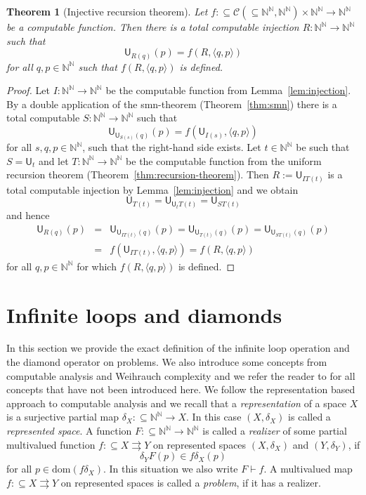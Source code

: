 \documentclass[11pt,a4paper]{amsart}
\theoremstyle{plain}
\newtheorem{thm}{Theorem}[section]
\theoremstyle{definition}
\theoremstyle{defC}
\theoremstyle{thmC}
\theoremstyle{plain}
\numberwithin{equation}{section}
\def\CC{{\mathcal C}}
\def\IN{{\mathbb{N}}}
\def\In{\subseteq}
\def\mto{\rightrightarrows}
\def\U{{\mathsf{{U}}}}
\def\dom{{\mathrm{dom}}}
\begin{document}
\begin{thm}[Injective recursion theorem]
\label{thm:injective-recursion}
Let $f:\In\CC(\In\IN^\IN,\IN^\IN)\times\IN^\IN\to\IN^\IN$ be a computable function.
Then there is a total computable injection $R:\IN^\IN\to\IN^\IN$ such that
\[\U_{R(q)}(p)=f(R,\langle q,p\rangle)\]
for all $q,p\in\IN^\IN$ such that $f(R,\langle q,p\rangle)$ is defined.
\end{thm}
\begin{proof}
Let $I:\IN^\IN\to\IN^\IN$ be the computable function from Lemma~\ref{lem:injection}.
By a double application of the smn-theorem (Theorem~\ref{thm:smn}) there is a total computable ${S:\IN^\IN\to\IN^\IN}$ such that
\[\U_{\U_{S(s)}(q)}(p)=f(\U_{I(s)},\langle q,p\rangle)\]
for all $s,q,p\in\IN^\IN$, such that the right-hand side exists. 
Let $t\in\IN^\IN$ be such that $S=\U_t$ and let $T:\IN^\IN\to\IN^\IN$ be the computable
function from the uniform recursion theorem (Theorem~\ref{thm:recursion-theorem}).
Then $R:=\U_{IT(t)}$ is a total computable injection by Lemma~\ref{lem:injection} and we obtain
\[\U_{T(t)}=\U_{\U_tT(t)}=\U_{ST(t)}\]
and hence
\begin{eqnarray*}
\U_{R(q)}(p) 
&=&\U_{\U_{IT(t)}(q)}(p)=\U_{\U_{T(t)}(q)}(p)=\U_{\U_{ST(t)}(q)}(p)\\
&=&f(\U_{IT(t)},\langle q,p\rangle)=f(R,\langle q,p\rangle)
\end{eqnarray*}
for all $q,p\in\IN^\IN$ for which $f(R,\langle q,p\rangle)$ is defined.
\end{proof}


\section{Infinite loops and diamonds}
\label{sec:definitions}

In this section we provide the exact definition of the infinite loop operation and the diamond operator on problems. 
We also introduce some concepts from computable analysis and Weihrauch complexity
and we refer the reader to \cite{BH21,Wei00} for all concepts that have not been introduced here.
We follow the representation based approach to computable analysis and we recall
that a {\em representation} of a space $X$ is a surjective partial map $\delta_X:\In\IN^\IN\to X$.
In this case $(X,\delta_X)$ is called a {\em represented space}.
A function $F:\In\IN^\IN\to\IN^\IN$
is called a {\em realizer} of some partial multivalued function $f:\In X\mto Y$ on represented spaces $(X,\delta_X)$ and $(Y,\delta_Y)$, if
\[\delta_YF(p)\in f\delta_X(p)\]
for all $p\in\dom(f\delta_X)$. In this situation we also write $F\vdash f$.
A multivalued map $f:\In X\mto Y$ on represented spaces is called a {\em problem}, if it has a realizer.
\end{document}
